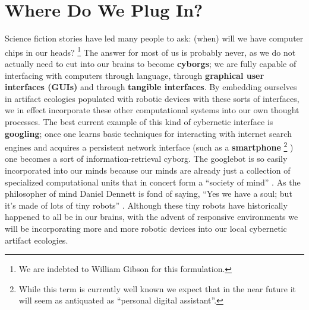\section{Where Do We Plug In?}
%
Science fiction stories have led many people to ask: (when) will we have computer chips in our heads?%
\footnote{We are indebted to William Gibson \citeyearpar{gibson_distrust} for this formulation.} 
The answer for most of us is probably never, as we do not actually need to cut into our brains to become \textbf{cyborgs}; we are fully capable of interfacing with computers through language, through \textbf{graphical user interfaces (GUIs)} and through \textbf{tangible interfaces}.
By embedding ourselves in artifact ecologies populated with robotic devices with these sorts of interfaces, we in effect incorporate these other computational systems into our own thought processes.
The best current example of this kind of cybernetic interface is \textbf{googling}; once one learns basic techniques for interacting with internet search engines and acquires a persistent network interface (such as a \textbf{smartphone}%
\footnote{While this term is currently well known we expect that in the near future it will seem as antiquated as ``personal digital assistant''.}%
) one becomes a sort of information-retrieval cyborg.
The googlebot is so easily incorporated into our minds because our minds are already just a collection of specialized computational units that in concert form a ``society of mind'' \citep{society_of_mind}. 
As the philosopher of mind Daniel Dennett is fond of saying, ``Yes we have a soul; but it's made of lots of tiny robots'' \citeyearpar[][p. 1]{freedom_evolves}. Although these tiny robots have historically happened to all be in our brains, with the advent of responsive environments we will be incorporating more and more robotic devices into our local cybernetic artifact ecologies.

